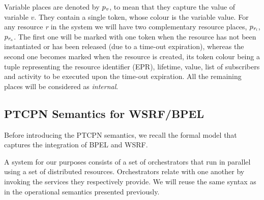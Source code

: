 \begin{definition} 
\begin{itemize}
Variable places are denoted by $p_{\it v}$, to mean that they 
capture the value of variable $v$. They contain a single token, whose colour is the variable
value.
% 
For any resource {\it r} in the system we will have two 
complementary resource places, $p_{\it r_i}$, $p_{\it r_a}$.
The first one will be marked with one token when the resource
has not been instantiated or has been released (due to a time-out
expiration), whereas the second one  
becomes marked when the resource is created, its token
colour being a tuple representing the resource identifier (EPR),
lifetime, value, %
list of subscribers and activity to be executed upon
the time-out expiration.
All the remaining places will be considered as {\em internal}.
\end{itemize}
\vspace{-0.5cm}
\end{definition}



\subsection*{PTCPN Semantics for WSRF/BPEL}

Before introducing the PTCPN semantics, we 
recall the formal model that 
captures the integration of BPEL and WSRF.

A system for our purposes consists of a set of orchestrators
that run in parallel using a set of distributed resources.
Orchestrators relate with one another by
invoking the services they respectively provide. We will reuse the same syntax as in the operational semantics presented previously.

